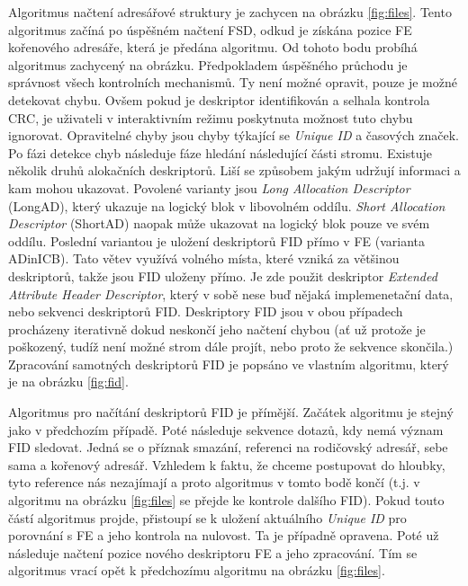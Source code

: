 Algoritmus načtení adresářové struktury je zachycen na obrázku \ref{fig:files}. Tento algoritmus začíná po úspěšném načtení FSD, odkud je získána pozice FE kořenového adresáře, která je předána algoritmu. Od tohoto bodu probíhá algoritmus zachycený na obrázku. Předpokladem úspěšného průchodu je správnost všech kontrolních mechanismů. Ty není možné opravit, pouze je možné detekovat chybu. Ovšem pokud je deskriptor identifikován a selhala kontrola CRC, je uživateli v interaktivním režimu poskytnuta možnost tuto chybu ignorovat. Opravitelné chyby jsou chyby týkající se \textit{Unique ID} a časových značek. Po fázi detekce chyb následuje fáze hledání následující části stromu. Existuje několik druhů alokačních deskriptorů. Liší se způsobem jakým udržují informaci a kam mohou ukazovat. Povolené varianty jsou \textit{Long Allocation Descriptor} (LongAD), který ukazuje na logický blok v libovolném oddílu. \textit{Short Allocation Descriptor} (ShortAD) naopak může ukazovat na logický blok pouze ve svém oddílu. Poslední variantou je uložení deskriptorů FID přímo v FE (varianta ADinICB). Tato větev využívá volného místa, které vzniká za většinou deskriptorů, takže jsou FID uloženy přímo. Je zde použit deskriptor \textit{Extended Attribute Header Descriptor}, který v sobě nese buď nějaká implemenetační data, nebo sekvenci deskriptorů FID. Deskriptory FID jsou v obou případech procházeny iterativně dokud neskončí jeho načtení chybou (ať už protože je poškozený, tudíž není možné strom dále projít, nebo proto že sekvence skončila.) Zpracování samotných deskriptorů FID je popsáno ve vlastním algoritmu, který je na obrázku \ref{fig:fid}.

Algoritmus pro načítání deskriptorů FID je přímější. Začátek algoritmu je stejný jako v předchozím případě. Poté následuje sekvence dotazů, kdy nemá význam FID sledovat. Jedná se o příznak smazání, referenci na rodičovský adresář, sebe sama a kořenový adresář. Vzhledem k faktu, že chceme postupovat do hloubky, tyto reference nás nezajímají a proto algoritmus v tomto bodě končí (t.j. v algoritmu na obrázku \ref{fig:files} se přejde ke kontrole dalšího FID). Pokud touto částí algoritmus projde, přistoupí se k uložení aktuálního \textit{Unique ID} pro porovnání s FE a jeho kontrola na nulovost. Ta je případně opravena. Poté už následuje načtení pozice nového deskriptoru FE a jeho zpracování. Tím se algoritmus vrací opět k předchozímu algoritmu na obrázku \ref{fig:files}.

